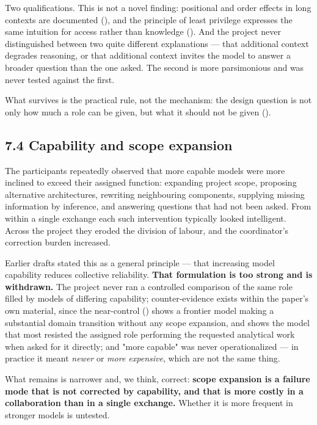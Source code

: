 Two qualifications. This is not a novel finding: positional and order effects in long contexts are documented (), and the principle of least privilege expresses the same intuition for access rather than knowledge (). And the project never distinguished between two quite different explanations — that additional context degrades reasoning, or that additional context invites the model to answer a broader question than the one asked. The second is more parsimonious and was never tested against the first.

What survives is the practical rule, not the mechanism: the design question is not only how much a role can be given, but what it should not be given ().


\subsection*{7.4 Capability and scope expansion}
\label{sec:en:7.4}

The participants repeatedly observed that more capable models were more inclined to exceed their assigned function: expanding project scope, proposing alternative architectures, rewriting neighbouring components, supplying missing information by inference, and answering questions that had not been asked. From within a single exchange each such intervention typically looked intelligent. Across the project they eroded the division of labour, and the coordinator's correction burden increased.

Earlier drafts stated this as a general principle — that increasing model capability reduces collective reliability. \textbf{That formulation is too strong and is withdrawn.} The project never ran a controlled comparison of the same role filled by models of differing capability; counter-evidence exists within the paper's own material, since the near-control () shows a frontier model making a substantial domain transition without any scope expansion, and  shows the model that most resisted the assigned role performing the requested analytical work when asked for it directly; and "more capable" was never operationalized — in practice it meant \emph{newer} or \emph{more expensive}, which are not the same thing.

What remains is narrower and, we think, correct: \textbf{scope expansion is a failure mode that is not corrected by capability, and that is more costly in a collaboration than in a single exchange.} Whether it is more frequent in stronger models is untested.


